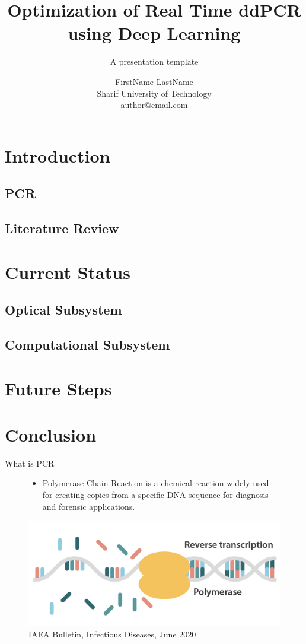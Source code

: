\documentclass[UKenglish, aspectratio = 169]{beamer}
\author[Author Name]
{FirstName LastName\\Sharif University of Technology\\author@email.com}
\title{Optimization of Real Time ddPCR \\using Deep Learning}
\subtitle{A presentation template}
\begin{document}
     \begin{frame}[allowframebreaks]
    \tableofcontents
\end{frame}

\section{Introduction}
	\subsection{PCR}
	\subsection{Literature Review}
\section{Current Status}
	\subsection{Optical Subsystem}
	\subsection{Computational Subsystem}
\section{Future Steps}
\section{Conclusion}
	
\begin{frame}{What is PCR}
		\begin{figure}
			\vspace{0.5cm}
			\begin{itemize}
					\item Polymerase Chain Reaction is a chemical reaction widely used for creating copies from a specific DNA sequence for diagnosis and forensic applications.
				\end{itemize}
			\centering
			\vspace{0.2cm}
			\includegraphics[scale = 0.20]{OM-images/PCR.png}
			\caption{\tiny{IAEA Bulletin, Infectious Diseases, June 2020}}
		\end{figure}
\end{frame}
\end{document}
